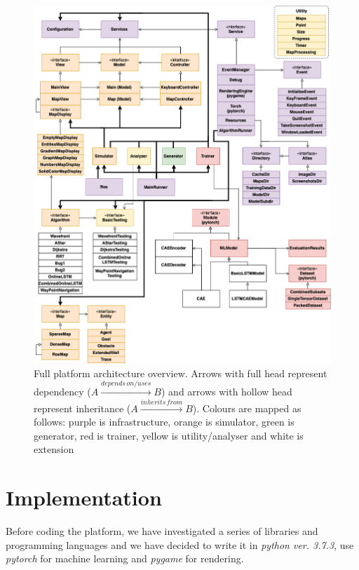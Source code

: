 \begin{figure}[h!]
    \centerfloat
    \includegraphics[scale=0.46]{images/simulator_architecture.png}
    \caption{Full platform architecture overview. Arrows with full head represent dependency ($A \xrightarrow{depends\, on/uses} B$) and arrows with hollow head represent inheritance ($A \xrightarrow{inherits\,from} B$). Colours are mapped as follows: purple is infrastructure, orange is simulator, green is generator, red is trainer, yellow is utility/analyser and white is extension}
    \label{fig:sim_architecture}
\end{figure}

\section{Implementation}

Before coding the platform, we have investigated a series of libraries and programming languages and we have decided to write it in \textit{python ver. 3.7.3}, use \textit{pytorch} \cite{paszke2017automatic} for machine learning and \textit{pygame} \cite{pygame} for rendering.

